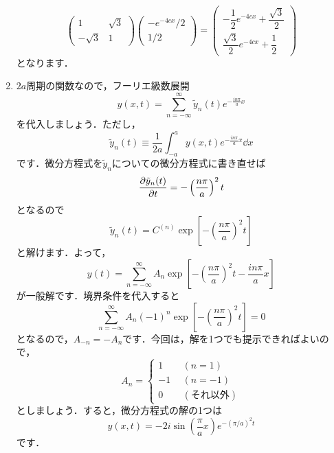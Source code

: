 \documentclass[a4paper,pdflatex,ja=standard]{bxjsarticle}
\begin{document}
\begin{enumerate}
\begin{equation}
\begin{pmatrix}
      1 & \sqrt{3} \\
      -\sqrt{3} & 1
    \end{pmatrix}
    \begin{pmatrix}
      -e^{-4cx}/2 \\
      1/2
    \end{pmatrix}    
    =
    \begin{pmatrix}
      -\dfrac{1}{2}e^{-4cx}
      +
      \dfrac{\sqrt{3}}{2}
      \\
      \dfrac{\sqrt{3}}{2}e^{-4cx}
      +
      \dfrac{1}{2}
    \end{pmatrix}
  \end{equation}
  となります．


  \item 

  $2a$周期の関数なので，フーリエ級数展開
  \begin{equation}
    y(x,t)
    =
    \sum_{n=-\infty}^{\infty}
    \tilde{y}_n(t)e^{-\frac{in\pi}{a}x}
  \end{equation}
  を代入しましょう．ただし，
  \begin{equation}
    \tilde{y}_n(t)
    \equiv
    \frac{1}{2a}\int_{-a}^{a}
    y(x,t)e^{-\frac{in\pi}{a}x}
    \dd x
  \end{equation}
  です．微分方程式を$\tilde{y}_n$についての微分方程式に書き直せば
  \begin{equation}
    \pdv{\tilde{y}_n(t)}{t}
    =
    -
    \left( \frac{n\pi}{a} \right)^2
    t
  \end{equation}
  となるので
  \begin{equation}
    \tilde{y}_{n}(t)
    =
    C^{(n)}
    \exp
    \left[  
      -
      \left( \frac{n\pi}{a} \right)^2
      t
    \right]
  \end{equation}
  と解けます．よって，
  \begin{equation}
    y(t)
    =
    \sum_{n=-\infty}^{\infty}
    A_n \exp
    \left[  
      -
      \left(  
        \frac{n\pi}{a}
      \right)^2
      t
      -
      \frac{in\pi}{a}
      x
    \right]
  \end{equation}
  が一般解です．境界条件を代入すると
  \begin{equation}
    \sum_{n=-\infty}^{\infty}
    A_n (-1)^n \exp
    \left[  
      -
      \left(  
        \frac{n\pi}{a}
      \right)^2
      t
    \right]
    =
    0
  \end{equation}
  となるので，$A_{-n}=-A_n$です．今回は，解を1つでも提示できればよいので，
  \begin{equation}
    A_{n}
    =
    \left\{
      \begin{alignedat}{1}
        1\ &\ (n=1) \\
        -1\ &\ (n=-1) \\
        0\ &\ (\text{それ以外})        
      \end{alignedat}
    \right.
  \end{equation}
  としましょう．すると，微分方程式の解の1つは
  \begin{equation}
    y(x,t)
    =
    -2i
    \sin\left( \frac{\pi}{a}x \right)
    e^{-(\pi/a)^2t}
  \end{equation}
  です．



\end{enumerate}
\end{document}
